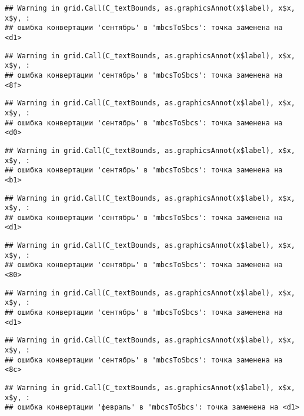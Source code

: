 \documentclass[
]{article}
\begin{document}
\begin{verbatim}
## Warning in grid.Call(C_textBounds, as.graphicsAnnot(x$label), x$x, x$y, :
## ошибка конвертации 'сентябрь' в 'mbcsToSbcs': точка заменена на <d1>
\end{verbatim}

\begin{verbatim}
## Warning in grid.Call(C_textBounds, as.graphicsAnnot(x$label), x$x, x$y, :
## ошибка конвертации 'сентябрь' в 'mbcsToSbcs': точка заменена на <8f>
\end{verbatim}

\begin{verbatim}
## Warning in grid.Call(C_textBounds, as.graphicsAnnot(x$label), x$x, x$y, :
## ошибка конвертации 'сентябрь' в 'mbcsToSbcs': точка заменена на <d0>
\end{verbatim}

\begin{verbatim}
## Warning in grid.Call(C_textBounds, as.graphicsAnnot(x$label), x$x, x$y, :
## ошибка конвертации 'сентябрь' в 'mbcsToSbcs': точка заменена на <b1>
\end{verbatim}

\begin{verbatim}
## Warning in grid.Call(C_textBounds, as.graphicsAnnot(x$label), x$x, x$y, :
## ошибка конвертации 'сентябрь' в 'mbcsToSbcs': точка заменена на <d1>
\end{verbatim}

\begin{verbatim}
## Warning in grid.Call(C_textBounds, as.graphicsAnnot(x$label), x$x, x$y, :
## ошибка конвертации 'сентябрь' в 'mbcsToSbcs': точка заменена на <80>
\end{verbatim}

\begin{verbatim}
## Warning in grid.Call(C_textBounds, as.graphicsAnnot(x$label), x$x, x$y, :
## ошибка конвертации 'сентябрь' в 'mbcsToSbcs': точка заменена на <d1>
\end{verbatim}

\begin{verbatim}
## Warning in grid.Call(C_textBounds, as.graphicsAnnot(x$label), x$x, x$y, :
## ошибка конвертации 'сентябрь' в 'mbcsToSbcs': точка заменена на <8c>
\end{verbatim}

\begin{verbatim}
## Warning in grid.Call(C_textBounds, as.graphicsAnnot(x$label), x$x, x$y, :
## ошибка конвертации 'февраль' в 'mbcsToSbcs': точка заменена на <d1>
\end{verbatim}
\end{document}
